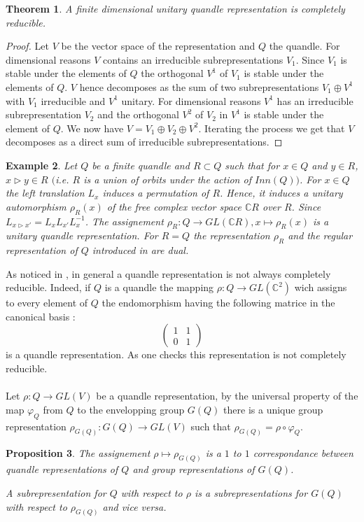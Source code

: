 \documentclass[12pt, reqno]{amsart}
\newtheorem{theorem}{Theorem}[section]
\newtheorem{proposition}[theorem]{Proposition}
\newtheorem{example}[theorem]{Example}
\begin{document}
\begin{theorem}
A finite dimensional unitary quandle representation is completely reducible.
\end{theorem}
\begin{proof}
Let $V$ be the vector space of the representation and $Q$ the quandle. For dimensional reasons $V$ contains an irreducible subrepresentations $V_1$. Since $V_1$ is stable under the elements of $Q$ the orthogonal $V^1$ of $V_1$ is stable under the elements of $Q$. $V$ hence decomposes as the sum of two subrepresentations $V_1\oplus V^1$ with $V_1$ irreducible and $V^1$ unitary. For dimensional reasons $V^1$ has an irreducible subrepresentation $V_2$ and the orthogonal $V^2$ of $V_2$ in $V^1$ is stable under the element of $Q$. We now have $V=V_1\oplus V_2 \oplus V^2$. Iterating the process we get that $V$ decomposes as a direct sum of irreducible subrepresentations.
\end{proof}
\begin{example}
Let $Q$ be a finite quandle and $R\subset Q$ such that for $x\in Q$ and $y\in R$, $x\triangleright y \in R$ $($i.e. $R$ is a union of orbits under the action of $Inn(Q)$$)$. For $x\in Q$ the left translation $L_x$ induces a permutation of $R$. Hence, it induces a unitary automorphism $\rho_R(x)$ of the free complex vector space $\mathbb{C}R$ over $R$. Since $L_{x\triangleright x'}=L_xL_{x'}L_x^{-1}$. The assignement $\rho_R :Q \to GL(\mathbb{C}R), x\mapsto\rho_R(x)$ is a unitary quandle representation. For $R=Q$ the representation $\rho_R$ and the regular representation of $Q$ introduced in \cite{rep} are dual.
\end{example}
As noticed in \cite{nondec}, in general a quandle representation is not always completely reducible. Indeed, if $Q$ is a quandle the mapping $\rho :Q \to GL(\mathbb{C}^2)$ wich assigns to every element of $Q$ the endomorphism having the following matrice in the canonical basis :
\[\begin{pmatrix}
1 & 1\\
0 & 1
\end{pmatrix}\]
is a quandle representation. As one checks this representation is not completely reducible.\\\\
Let $\rho : Q \to GL(V)$ be a quandle representation, by the universal property of the map $\varphi_Q$ from $Q$ to the envelopping group $G(Q)$ there is a unique group representation $\rho_{G(Q)}: G(Q)\to GL(V)$ such that $\rho_{G(Q)}=\rho \circ \varphi_Q$.
\begin{proposition}
\item[1)] The assignement $\rho \mapsto \rho_{G(Q)}$ is a $1$ to $1$ correspondance between quandle representations of $Q$ and group representations of $G(Q)$.
\item[2)] A subrepresentation for $Q$ with respect to $\rho$ is a subrepresentations for $G(Q)$ with respect to $\rho_{G(Q)}$ and vice versa.
\end{proposition}
\end{document}
